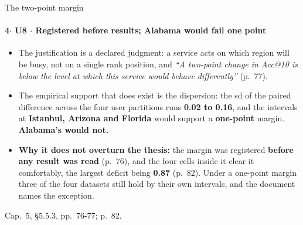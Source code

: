 \documentclass{beamer}
\begin{document}
\begin{frame}[noframenumbering]{The two-point margin}
    \framesubtitle{\normalsize 4$\cdot$ \textbf{U8} $\cdot$ Registered before results; Alabama would fail one point}
    \hypertarget{b15}{}
    \hypertarget{u8}{}
    \small
    \begin{itemize}\setlength{\itemsep}{0pt}\setlength{\parskip}{0pt}
        \item The justification is a declared judgment: a service acts on which region will be busy, not on a single rank position, and \textit{``A two-point change in Acc@10 is below the level at which this service would behave differently''} (p.~77).
        \item The empirical support that does exist is the dispersion: the sd of the paired difference across the four user partitions runs \textbf{0.02 to 0.16}, and the intervals at \textbf{Istanbul, Arizona and Florida} would support a \textbf{one-point} margin. \textbf{Alabama's would not.}
        \item \textbf{Why it does not overturn the thesis:} the margin was registered \textbf{before any result was read} (p.~76), and the four cells inside it clear it comfortably, the largest deficit being \textbf{0.87} (p.~82). Under a one-point margin three of the four datasets still hold by their own intervals, and the document names the exception.
    \end{itemize}
    \vfill
    {\scriptsize
    \begin{minipage}[b]{0.775\linewidth}\raggedright\textcolor{black!70}{Cap.~5, §5.5.3, pp.~76-77; p.~82.}\end{minipage}\hfill
    \begin{minipage}[b]{0.20\linewidth}\raggedleft \hyperlink{b0}{}\end{minipage}}
\end{frame}
\end{document}
